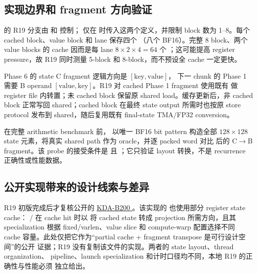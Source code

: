\subsection{实现边界和 fragment 方向验证}

 的 R19 分支由
 和
 控制； 仅在
 时传入这两个定义，并限制 block
数为 1--8。每个 cached block、value block 和 lane 保存四个 
（八个 BF16）。完整 \(8\) block、两个 value blocks 的 cache 因而是每 lane
\(8\times2\times4=64\) 个 ；这可能提高 register pressure，故 R19 同时测量 5-block
和 8-block，而不预设全 cache 一定更快。

Phase 6 的 state C fragment 逻辑方向是 \([\mathrm{key},\mathrm{value}]\)，
下一 chunk 的 Phase 1 需要 B operand \([\mathrm{value},\mathrm{key}]\)。R19
对 cached Phase 1 fragment 使用既有  做 register
file 内转置；未 cached block 保留原  shared load。缓存更新后，非
cached block 正常写回 shared；cached block 在最终 state output 所需时也按原
store protocol 发布到 shared，随后复用既有 final-state TMA/FP32 conversion。

在完整 arithmetic benchmark 前，
以唯一 BF16 bit pattern 构造全部 \(128\times128\) state 元素，将真实
 shared path 作为 oracle，并逐 packed word 对比
 后的 C\(\to\)B fragment。该 probe 的接受条件是
 且 ；它只验证 layout
转换，不是 recurrence 正确性或性能数据。

\subsection{公开实现带来的设计线索与差异}

R19 初版完成后才复核公开的
\href{https://github.com/Int21-AI/KDA-B200/blob/main/csrc/flash_kda_cuda.cu}
{KDA-B200 }。该实现的
 也使用部分 register state cache：
/ 在 cache hit 时以
 将 cached state 转成 projection 所需方向，且其
specialization 根据 fixed/varlen、value slice 和 compute-warp 配置选择不同 cache
容量。此处仅把它作为“partial cache + fragment transpose 是可行设计空间”的公开
证据；R19 没有复制该文件的实现。两者的 state layout、thread organization、
pipeline、launch specialization 和计时口径均不同，本地 R19 的正确性与性能必须
独立给出。

